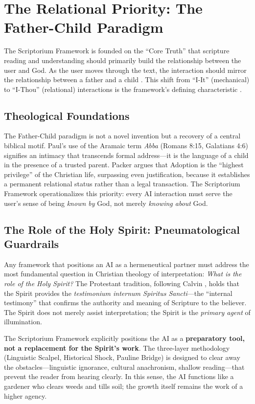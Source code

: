 \section{The Relational Priority: The Father-Child Paradigm}
The Scriptorium Framework is founded on the ``Core Truth'' that scripture reading and understanding should primarily build the relationship between the user and God. As the user moves through the text, the interaction should mirror the relationship between a father and a child \cite{nouwen1992}. This shift from ``I-It'' (mechanical) to ``I-Thou'' (relational) interactions is the framework's defining characteristic \cite{buber1923}.

\subsection{Theological Foundations}
The Father-Child paradigm is not a novel invention but a recovery of a central biblical motif. Paul's use of the Aramaic term \textit{Abba} (Romans 8:15, Galatians 4:6) signifies an intimacy that transcends formal address---it is the language of a child in the presence of a trusted parent. Packer \cite{packer1973} argues that Adoption is the ``highest privilege'' of the Christian life, surpassing even justification, because it establishes a permanent relational status rather than a legal transaction. The Scriptorium Framework operationalizes this priority: every AI interaction must serve the user's sense of being \textit{known by} God, not merely \textit{knowing about} God.

\subsection{The Role of the Holy Spirit: Pneumatological Guardrails}
Any framework that positions an AI as a hermeneutical partner must address the most fundamental question in Christian theology of interpretation: \textit{What is the role of the Holy Spirit?} The Protestant tradition, following Calvin \cite{calvin1559}, holds that the Spirit provides the \textit{testimonium internum Spiritus Sancti}---the ``internal testimony'' that confirms the authority and meaning of Scripture to the believer. The Spirit does not merely assist interpretation; the Spirit is the \textit{primary agent} of illumination.

The Scriptorium Framework explicitly positions the AI as a \textbf{preparatory tool, not a replacement for the Spirit's work}. The three-layer methodology (Linguistic Scalpel, Historical Shock, Pauline Bridge) is designed to clear away the obstacles---linguistic ignorance, cultural anachronism, shallow reading---that prevent the reader from hearing clearly. In this sense, the AI functions like a gardener who clears weeds and tills soil; the growth itself remains the work of a higher agency.

